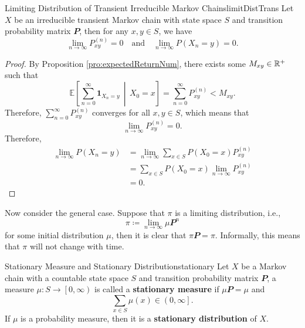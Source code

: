 \documentclass[math, code]{amznotes}
\theoremstyle{remark}
\begin{document}
\begin{probox}{\small Limiting Distribution of Transient Irreducible Markov Chains}{limitDistTrans}
    Let $X$ be an irreducible transient Markov chain with state space $S$ and transition probability matrix $\mathbfit{P}$, then for any $x, y \in S$, we have 
    \begin{equation*}
        \lim_{n \to \infty}P^{(n)}_{xy} = 0 \quad\textrm{and}\quad \lim_{n \to \infty}P\left(X_n = y\right) = 0.
    \end{equation*}
    \tcblower
    \begin{proof}
        By Proposition \ref{pro:expectedReturnNum}, there exists some $M_{xy} \in \mathbb{R}^+$ such that 
        \begin{equation*}
            \mathbb{E}\left[\sum_{n = 0}^{\infty}\mathbf{1}_{X_n = y} \,\middle\vert\, X_0 = x\right] = \sum_{n = 0}^{\infty}P^{(n)}_{xy} < M_{xy}.
        \end{equation*}
        Therefore, $\sum_{n = 0}^{\infty}P^{(n)}_{xy}$ converges for all $x, y \in S$, which means that 
        \begin{equation*}
            \lim_{n \to \infty}P^{(n)}_{xy} = 0.
        \end{equation*}
        Therefore, 
        \begin{align*}
            \lim_{n \to \infty}P\left(X_n = y\right) & = \lim_{n \to \infty}\sum_{x \in S}P\left(X_0 = x\right)P^{(n)}_{xy} \\
            & = \sum_{x \in S}P\left(X_0 = x\right)\lim_{n \to \infty}P^{(n)}_{xy} \\
            & = 0.
        \end{align*}
    \end{proof}
\end{probox}
Now consider the general case. Suppose that $\pi$ is a limiting distribution, i.e., 
\begin{equation*}
    \pi \coloneqq \lim_{n \to \infty}\mu\mathbfit{P}^n
\end{equation*}
for some initial distribution $\mu$, then it is clear that $\pi\mathbfit{P} = \pi$. Informally, this means that $\pi$ will not change with time.
\begin{dfnbox}{Stationary Measure and Stationary Distribution}{stationary}
    Let $X$ be a Markov chain with a countable state space $S$ and transition probability matrix $\mathbfit{P}$, a measure $\mu \colon S \to \left[0, \infty\right)$ is called a {\color{red} \textbf{stationary measure}} if $\mu\mathbfit{P} = \mu$ and 
    \begin{equation*}
        \sum_{x \in S}\mu\left(x\right) \in \left(0, \infty\right].
    \end{equation*}
    If $\mu$ is a probability measure, then it is a {\color{red} \textbf{stationary distribution}} of $X$.
\end{dfnbox}
\end{document}
